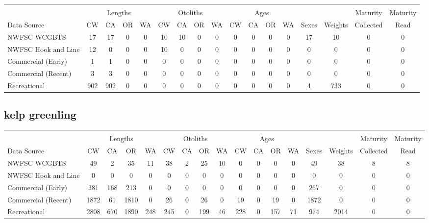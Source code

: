 \documentclass[12pt,]{article}
\begin{document}
\begin{table}[ht]
\centering
\begingroup\fontsize{10pt}{10pt}\selectfont
\begin{tabular}{|l|cccc|cccc|cccc|c|c|c|c|}
  \hline
 &  &  &  &  &  &  &  &  &  &  &  &  &  &  &  &  \\ 
   & \multicolumn{4}{c}{Lengths} &  \multicolumn{4}{c}{Otoliths} & \multicolumn{4}{c}{Ages} &  & & Maturity & Maturity\\
 Data Source & CW & CA & OR & WA & CW & CA & OR & WA & CW & CA & OR & WA & Sexes & Weights & Collected & Read\\
 \hline
NWFSC WCGBTS & 17 & 17 & 0 & 0 & 10 & 10 & 0 & 0 & 0 & 0 & 0 & 0 & 17 & 10 & 0 & 0 \\ 
  NWFSC Hook and Line & 12 & 0 & 0 & 0 & 10 & 0 & 0 & 0 & 0 & 0 & 0 & 0 & 0 & 0 & 0 & 0 \\ 
  Commercial (Early) & 1 & 1 & 0 & 0 & 0 & 0 & 0 & 0 & 0 & 0 & 0 & 0 & 0 & 0 & 0 & 0 \\ 
  Commercial (Recent) & 3 & 3 & 0 & 0 & 0 & 0 & 0 & 0 & 0 & 0 & 0 & 0 & 0 & 0 & 0 & 0 \\ 
  Recreational & 902 & 902 & 0 & 0 & 0 & 0 & 0 & 0 & 0 & 0 & 0 & 0 & 4 & 733 & 0 & 0 \\ 
   \hline
\end{tabular}
\endgroup
\end{table}

\FloatBarrier  

\newpage  

\subsection{kelp greenling}\label{kelp-greenling}

\begin{table}[ht]
\centering
\begingroup\fontsize{10pt}{10pt}\selectfont
\begin{tabular}{|l|cccc|cccc|cccc|c|c|c|c|}
  \hline
 &  &  &  &  &  &  &  &  &  &  &  &  &  &  &  &  \\ 
   & \multicolumn{4}{c}{Lengths} &  \multicolumn{4}{c}{Otoliths} & \multicolumn{4}{c}{Ages} &  & & Maturity & Maturity\\
 Data Source & CW & CA & OR & WA & CW & CA & OR & WA & CW & CA & OR & WA & Sexes & Weights & Collected & Read\\
 \hline
NWFSC WCGBTS & 49 & 2 & 35 & 11 & 38 & 2 & 25 & 10 & 0 & 0 & 0 & 0 & 49 & 38 & 8 & 8 \\ 
  NWFSC Hook and Line & 0 & 0 & 0 & 0 & 0 & 0 & 0 & 0 & 0 & 0 & 0 & 0 & 0 & 0 & 0 & 0 \\ 
  Commercial (Early) & 381 & 168 & 213 & 0 & 0 & 0 & 0 & 0 & 0 & 0 & 0 & 0 & 267 & 0 & 0 & 0 \\ 
  Commercial (Recent) & 1872 & 61 & 1810 & 0 & 26 & 0 & 26 & 0 & 19 & 0 & 19 & 0 & 1872 & 0 & 0 & 0 \\ 
  Recreational & 2808 & 670 & 1890 & 248 & 245 & 0 & 199 & 46 & 228 & 0 & 157 & 71 & 974 & 2014 & 0 & 0 \\ 
   \hline
\end{tabular}
\endgroup
\end{table}
\end{document}
